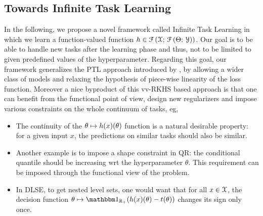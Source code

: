 \subsection{Towards Infinite Task Learning} \label{sec:inf-task}
In the following, we propose a novel framework called Infinite Task Learning in
which we learn a function-valued function $h \in \mathcal{F}\left(\mathcal{X};\,
\mathcal{F}\left(\Theta;\,\mathcal{Y}\right)\right)$. Our goal is to be able to
handle new tasks after the learning phase and thus, not to be limited to given
predefined values of the hyperparameter. Regarding this goal, our framework
generalizes the \acl{PTL} approach introduced by
\citet{takeuchi2013parametric}, by allowing a wider class of models and relaxing the
hypothesis of piece-wise linearity of the loss function.
%
Moreover a nice byproduct of this \acs{vv-RKHS} based approach is
that one can benefit from the functional point of view, design new regularizers
and impose various constraints on the whole continuum of tasks, \acs{eg},
\begin{itemize}[labelindent=0em,leftmargin=*,topsep=0cm,partopsep=0cm,
                parsep=2mm,itemsep=0cm]
    \item The continuity of the $\theta \mapsto h(x)(\theta)$
    function is a natural desirable property: for a given input $x$, the
    predictions on similar tasks should also be similar.
    \item Another example is to impose a shape constraint in \ac{QR}:
     the conditional quantile should be increasing \ac{wrt} the
    hyperparameter $\theta$. This requirement can be imposed through the
    functional view of the problem.
    \item In \ac{DLSE}, to get nested level sets, one would want that for all $
    x \in \mathcal{X}$, the decision function $\theta \mapsto
    \indicator{\reals_{+}}(h(x)(\hyperparameter) - t(\hyperparameter))$ changes
    its sign only once.
\end{itemize}
